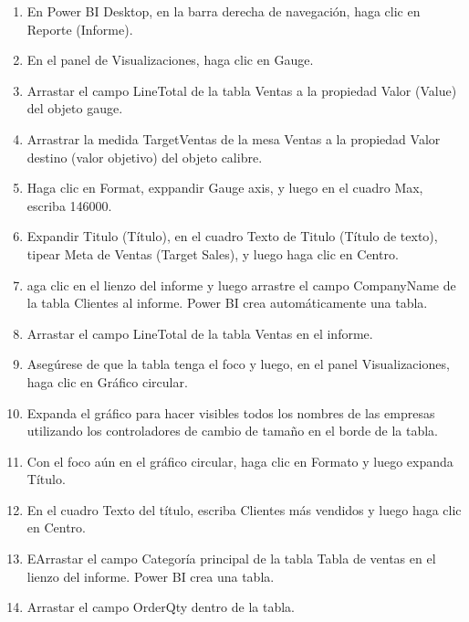 \documentclass[12pt,letterpaper]{article}
\begin{document}
\begin{enumerate}

\item En Power BI Desktop, en la barra derecha de navegación, haga clic en Reporte (Informe).

    \item En el panel de Visualizaciones, haga clic en Gauge.

    \item Arrastar el campo LineTotal de la tabla Ventas a la propiedad Valor (Value) del objeto gauge.

    \item Arrastrar la medida TargetVentas de la mesa Ventas a la propiedad Valor destino (valor objetivo) del objeto calibre.
    
    \item Haga clic en Format, exppandir Gauge axis, y luego en el cuadro Max, escriba 146000.
    
    \item Expandir Titulo (Título), en el cuadro Texto de Titulo (Título de texto), tipear Meta de Ventas (Target Sales), y luego haga clic en Centro.


    \item aga clic en el lienzo del informe y luego arrastre el campo CompanyName de la tabla Clientes al informe. Power BI crea automáticamente una tabla.

    \item Arrastar el campo LineTotal de la tabla Ventas en el informe.

    
    \item Asegúrese de que la tabla tenga el foco y luego, en el panel Visualizaciones, haga clic en Gráfico circular.
    
    \item Expanda el gráfico para hacer visibles todos los nombres de las empresas utilizando los controladores de cambio de tamaño en el borde de la tabla.
    
    \item Con el foco aún en el gráfico circular, haga clic en Formato y luego expanda Título.


    \item En el cuadro Texto del título, escriba Clientes más vendidos y luego haga clic en Centro.
    \item EArrastar el campo Categoría principal de la tabla Tabla de ventas en el lienzo del informe. Power BI crea una tabla.
    
    \item Arrastar el campo OrderQty dentro de la tabla.



\end{enumerate}
\end{document}
